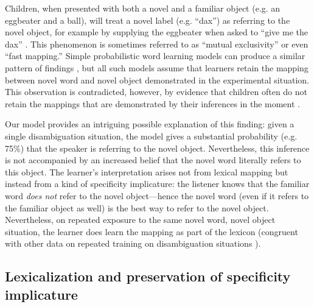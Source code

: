\documentclass{article} %
\begin{document}
Children, when presented with both a novel and a familiar object
(e.g. an eggbeater and a ball), will treat a novel label
(e.g. ``dax'') as referring to the novel object, for example by
supplying the eggbeater when asked to ``give me the dax''
\cite{markman1988}. This phenomenon is sometimes referred to as
``mutual exclusivity'' or even ``fast mapping.'' Simple probabilistic word learning models can produce a
similar pattern of findings \cite{frank2009}, but all such models assume that learners retain the
mapping between novel word and novel object demonstrated in the
experimental situation. This observation is contradicted, however, by
evidence that children often do not retain the mappings that are
demonstrated by their inferences in the moment \cite{horst2008}.

Our model provides an intriguing possible explanation of this finding:
given a single disambiguation situation, the model gives a substantial
probability (e.g. 75\%) that the speaker is referring to the novel
object. Nevertheless, this inference is not accompanied by an increased belief
that the novel word literally refers to this object. The learner's
interpretation arises not from lexical mapping but instead from a kind
of 
specificity implicature: the listener knows that the familiar word
\emph{does not} refer to the novel object---hence the novel word (even
if it refers to the familiar object as well) is the best way to refer
to the novel object. Nevertheless, on repeated exposure to the same
novel word, novel object situation, the learner does learn the mapping
as part of the lexicon (congruent with other data on repeated training
on disambiguation situations \cite{bion2012}).


\subsection{Lexicalization and preservation of specificity implicature}
\label{sec:learning-specificity-implic}

\end{document}

